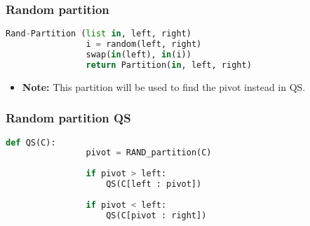     \subsubsection{Random partition}
    \begin{definition}
        \begin{lstlisting}[language=Python, caption={Rand-Partition Function Pseudocode}]
            Rand-Partition (list in, left, right)
                i = random(left, right)
                swap(in(left), in(i))
                return Partition(in, left, right)
        \end{lstlisting}
        \begin{itemize}
            \item \textbf{Note:} This partition will be used to find the pivot instead in QS.
        \end{itemize}
    \end{definition}

    \subsubsection{Random partition QS}
    \begin{definition}
        \begin{lstlisting}[language=Python, caption={QuickSort with Random Partition}]
            def QS(C):
                pivot = RAND_partition(C)
                
                if pivot > left:
                    QS(C[left : pivot])
                    
                if pivot < left:
                    QS(C[pivot : right])
            \end{lstlisting}            
    \end{definition}

